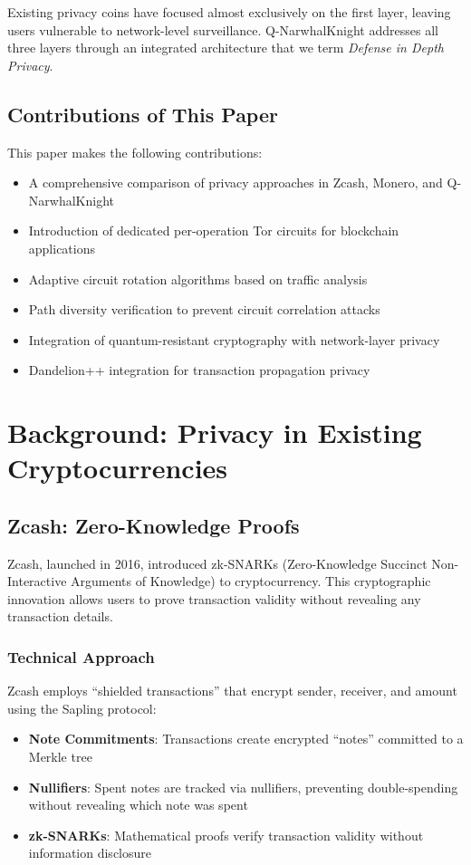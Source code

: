 \documentclass[11pt,a4paper]{article}
\begin{document}
Existing privacy coins have focused almost exclusively on the first layer, leaving users vulnerable to network-level surveillance. Q-NarwhalKnight addresses all three layers through an integrated architecture that we term \textit{Defense in Depth Privacy}.

\subsection{Contributions of This Paper}

This paper makes the following contributions:
\begin{itemize}[leftmargin=*]
    \item A comprehensive comparison of privacy approaches in Zcash, Monero, and Q-NarwhalKnight
    \item Introduction of dedicated per-operation Tor circuits for blockchain applications
    \item Adaptive circuit rotation algorithms based on traffic analysis
    \item Path diversity verification to prevent circuit correlation attacks
    \item Integration of quantum-resistant cryptography with network-layer privacy
    \item Dandelion++ integration for transaction propagation privacy
\end{itemize}

\section{Background: Privacy in Existing Cryptocurrencies}

\subsection{Zcash: Zero-Knowledge Proofs}

Zcash, launched in 2016, introduced zk-SNARKs (Zero-Knowledge Succinct Non-Interactive Arguments of Knowledge) to cryptocurrency. This cryptographic innovation allows users to prove transaction validity without revealing any transaction details.

\subsubsection{Technical Approach}
Zcash employs ``shielded transactions'' that encrypt sender, receiver, and amount using the Sapling protocol:
\begin{itemize}[leftmargin=*]
    \item \textbf{Note Commitments}: Transactions create encrypted ``notes'' committed to a Merkle tree
    \item \textbf{Nullifiers}: Spent notes are tracked via nullifiers, preventing double-spending without revealing which note was spent
    \item \textbf{zk-SNARKs}: Mathematical proofs verify transaction validity without information disclosure
\end{itemize}
\end{document}
